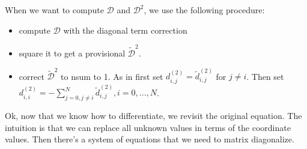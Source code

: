 \documentclass[12pt]{article}
\begin{document}
When we want to compute $\mathcal{D}$ and $\mathcal{D}^2$, we use the following procedure:
\begin{itemize}
    \item compute $\mathcal{D}$ with the diagonal term correction
    \item square it to get a provisional $\tilde{\mathcal{D}}^2$.
    \item correct $\tilde{\mathcal{D}}^2$ to nsum to 1. As in first set $d^{(2)}_{i,j} = \tilde{d}^{(2)}_{i,j}$ for $j \neq i$. Then set $d^{(2)}_{i,i} = -\sum_{j=0, j\neq i}^{N} \tilde{d}^{(2)}_{i,j}, i = 0,..., N$.
\end{itemize}

Ok, now that we know how to differentiate, we revisit the original equation. The intuition is that we can replace all unknown values in terms of the coordinate values. Then there's a system of equations that we need to matrix diagonalize.
\end{document}

